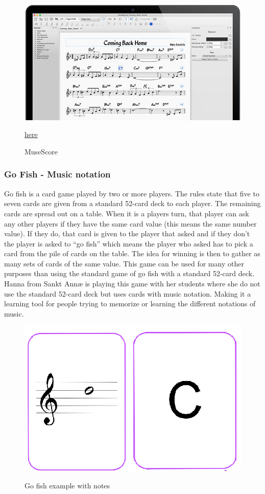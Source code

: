\begin{figure}[H]
	\centering
	\includegraphics[width=0.8\linewidth]{figure/Analysis/musescore.png}
	\label{fig:MuseScore}
	\caption{MuseScore}
	\href{https://musescore.org/da}{\color{blue}here}
\end{figure}

\subsubsection{Go Fish - Music notation}
Go fish is a card game played by two or more players. The rules state that five to seven cards are given from a standard 52-card deck to each player. The remaining cards are spread out on a table. When it is a players turn, that player can ask any other players if they have the same card value (this means the same number value). If they do, that card is given to the player that asked and if they don’t the player is asked to “go fish” which means the player who asked has to pick a card from the pile of cards on the table. The idea for winning is then to gather as many sets of cards of the same value. This game can be used for many other purposes than using the standard game of go fish with a standard 52-card deck. Hanna from Sankt Annæ is playing this game with her students where she do not use the standard 52-card deck but uses cards with music notation. Making it a learning tool for people trying to memorize or learning the different notations of music. 

\begin{figure}[H]
	\centering
	\includegraphics[width=0.7\linewidth]{figure/Analysis/gofish}
	\label{fig:gofish}
	\caption{Go fish example with notes}
\end{figure}

